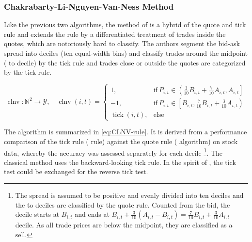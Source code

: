 \subsubsection{Chakrabarty-Li-Nguyen-Van-Ness
    Method}\label{sec:chakarabarty-li-nguyen-van-ness-method}

Like the previous two algorithms, the  method of \textcite[][3809]{chakrabartyTradeClassificationAlgorithms2012} is a hybrid of the quote and tick rule and extends the  rule by a differentiated treatment of trades inside the quotes, which are notoriously hard to classify. The authors segment the bid-ask spread into deciles (ten equal-width bins) and classify trades around the midpoint ( to  decile) by the tick rule and trades close or outside the quotes are categorized by the tick rule.

\begin{equation}
    \operatorname{clnv} \colon \mathbb{N}^2 \to \mathcal{Y}, \quad
    \operatorname{clnv}(i, t)=
    \begin{cases}
        1,                         & \text{if}\ P_{i, t} \in \left(\frac{3}{10} B_{i,t} + \frac{7}{10} A_{i,t}, A_{i, t}\right] \\
        -1,                        & \text{if}\ P_{i, t} \in \left[ B_{i,t}, \frac{7}{10} B_{i,t} + \frac{3}{10} A_{i,t}\right) \\
        \operatorname{tick}(i, t), & \text{else}
    \end{cases}
    \label{eq:CLNV-rule}
\end{equation}


The algorithm is summarized in \cref{eq:CLNV-rule}. It is derived from a performance comparison of the tick rule ( rule) against the quote rule ( algorithm) on stock data, whereby the accuracy was assessed separately for each decile \footnote{The spread is assumed to be positive and evenly divided into ten deciles and the  to  deciles are classified by the quote rule. Counted from the bid, the  decile starts at $B_{i,t}$ and ends at $B_{i,t} + \tfrac{3}{10} (A_{i,t} - B_{i,t}) = \tfrac{7}{10} B_{i,t} + \tfrac{3}{10} A_{i,t}$  decile. As all trade prices are below the midpoint, they are classified as a sell.}. The classical  method uses the backward-looking tick rule. In the spirit of \textcite[][735]{leeInferringTradeDirection1991}, the tick test could be exchanged for the reverse tick test.

